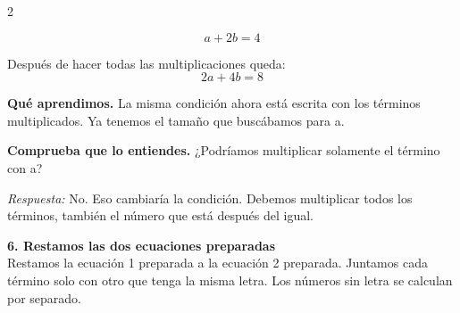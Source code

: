 \documentclass[11pt,a4paper,landscape]{article}
\begin{document}
\begin{multicols*}{2}
\begin{minipage}{\linewidth}
\[a + 2b = 4\]
\par{}\par\smallskip
\par\smallskip Después de hacer todas las multiplicaciones queda:
\[2a + 4b = 8\]
\par\smallskip\textbf{Qué aprendimos.} La misma condición ahora está escrita con los términos multiplicados. Ya tenemos el tamaño que buscábamos para a.
\par\smallskip\textbf{Comprueba que lo entiendes.} ¿Podríamos multiplicar solamente el término con a?\par\textit{Respuesta:} No. Eso cambiaría la condición. Debemos multiplicar todos los términos, también el número que está después del igual.
\end{minipage}\par\medskip
\noindent\begin{minipage}{\linewidth}\textbf{6. Restamos las dos ecuaciones preparadas}\\[2pt]Restamos la ecuación 1 preparada a la ecuación 2 preparada. Juntamos cada término solo con otro que tenga la misma letra. Los números sin letra se calculan por separado.
\par{}\par\smallskip

\end{minipage}
\end{multicols*}
\end{document}
